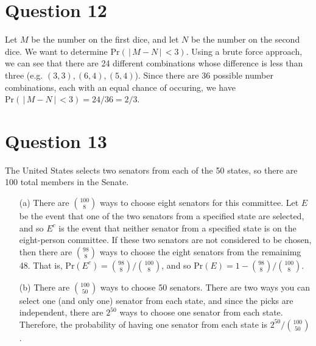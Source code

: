 \documentclass[10pt]{article}
\begin{document}
\section{Question 12} \noindent
Let \(M\) be the number on the first dice, and let \(N\) be the number on the second dice. We want to determine \(\mathrm{Pr}(\,|\,M - N\,|\, < 3)\).
Using a brute force approach, we can see that there are 24 different combinations whose difference is less than three (e.g. \((3,3), (6,4), (5,4)\)). Since 
there are 36 possible number combinations, each with an equal chance of occuring, we have \(\mathrm{Pr}(\,|\,M - N\,|\, < 3) = 24/36 = 2/3\). 

\section{Question 13} \noindent
The United States selects two senators from each of the 50 states, so there are 100 total members in the Senate. 
\begin{itemize}
    \item[(a)] There are \(\binom{100}{8}\) ways to choose eight senators for this committee. 
    Let \(E\) be the event that one of the two senators from a specified state are selected, and so \(E^c\) is the event that neither senator from 
    a specified state is on the eight-person committee. If these two senators are not considered to be chosen, then there are \(\binom{98}{8}\) ways to choose 
    the eight senators from the remainimg 48. That is, \(\mathrm{Pr}(E^c) = \binom{98}{8} / \binom{100}{8}\), and so 
    \(\mathrm{Pr}(E) = 1 - \binom{98}{8} / \binom{100}{8}\).
    \item[(b)] There are \(\binom{100}{50}\) ways to choose 50 senators. There are two ways you can select one (and only one) senator from each state, and 
    since the picks
    are independent, there are \(2^{50}\) ways to choose one senator from each state. Therefore, the probability of having one senator from each state is 
    \(2^{50} / \binom{100}{50}\). 
\end{itemize}

\end{document}
